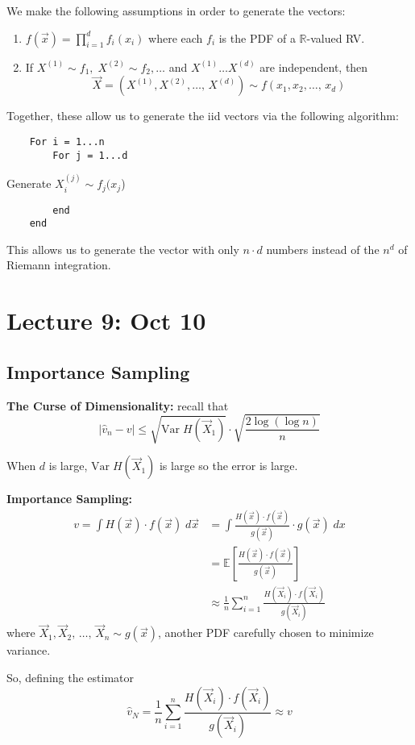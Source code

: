 \documentclass[12pt]{article}
\renewcommand{\hat}[1]{\widehat{#1}}
\newcommand{\R}{\mathbb{R}}
\newcommand{\E}{\mathbb{E}}
\newcommand{\Var}{\text{Var}\;}
\begin{document}
We make the following assumptions in order to generate the vectors:
\begin{enumerate}
    \item $f(\vec x) = \prod_{i=1}^d f_i(x_i)$ where each $f_i$ is the PDF of a $\R$-valued RV. 
    \item If $X^{(1)} \sim f_1, \; X^{(2)} \sim f_2, \dots$ and $X^{(1)} \dots X^{(d)}$ are independent, then 
    \[\vec X = (X^{(1)}, X^{(2)}, \dots,\, X^{(d)}) \sim f(x_1, x_2, \dots,\, x_d)\]
\end{enumerate}
Together, these allow us to generate the iid vectors via the following algorithm: 
\begin{verbatim}
    For i = 1...n
        For j = 1...d
\end{verbatim}
\qquad \qquad \qquad Generate $X_i^{(j)} \sim f_j(x_j$)
\begin{verbatim}
        end
    end
\end{verbatim}

This allows us to generate the vector with only $n \cdot d$ numbers instead of the $n^{d}$ of Riemann integration. 

\section{Lecture 9: Oct 10}
\subsection{Importance Sampling}
\textbf{The Curse of Dimensionality:} recall that 
\[\big \vert \hat v_n - v\big\vert \leq \sqrt{\Var H(\vec X_1)} \cdot \sqrt{\frac{2\log(\log n)}{n}}\]

When $d$ is large, $\Var H(\vec X_1)$ is large so the error is large.


\textbf{Importance Sampling:}
\begin{align*}
    v = \int H(\vec x) \cdot f(\vec x)\; d\vec x &= \int \frac{H(\vec x) \cdot f(\vec x)}{g(\vec x)} \cdot g(\vec x)\; dx\\
    &= \E[\frac{H(\vec x) \cdot f(\vec x)}{g(\vec x)}]\\ 
    &\approx \frac{1}{n} \sum_{i=1}^n \frac{H(\vec X_i) \cdot f(\vec X_i)}{g(\vec X_i)} 
\end{align*}
where $\vec X_1, \vec X_2, \, \dots,\, \vec X_n \sim g(\vec x)$, another PDF carefully chosen to minimize variance. 

So, defining the estimator 
\[\hat v_N = \frac{1}{n}\sum_{i=1}^n \frac{H(\vec X_i) \cdot f(\vec X_i)}{g(\vec X_i)}\approx v\]
\end{document}
